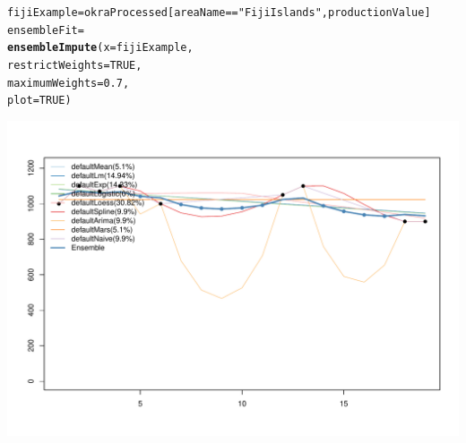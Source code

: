 \documentclass[nojss]{jss}\usepackage[]{graphicx}\usepackage[]{color}
\makeatletter
\def\maxwidth{ %
  \ifdim\Gin@nat@width>\linewidth
    \linewidth
  \else
    \Gin@nat@width
  \fi
}
\newcommand{\hlnum}[1]{\textcolor[rgb]{0.686,0.059,0.569}{#1}}%
\newcommand{\hlstr}[1]{\textcolor[rgb]{0.192,0.494,0.8}{#1}}%
\newcommand{\hlopt}[1]{\textcolor[rgb]{0,0,0}{#1}}%
\newcommand{\hlstd}[1]{\textcolor[rgb]{0.345,0.345,0.345}{#1}}%
\newcommand{\hlkwb}[1]{\textcolor[rgb]{0.69,0.353,0.396}{#1}}%
\newcommand{\hlkwc}[1]{\textcolor[rgb]{0.333,0.667,0.333}{#1}}%
\newcommand{\hlkwd}[1]{\textcolor[rgb]{0.737,0.353,0.396}{\textbf{#1}}}%
\newenvironment{kframe}{%
 \def\at@end@of@kframe{}%
 \ifinner\ifhmode%
  \def\at@end@of@kframe{\end{minipage}}%
  \begin{minipage}{\columnwidth}%
 \fi\fi%
 \def\FrameCommand##1{\hskip\@totalleftmargin \hskip-\fboxsep
 \colorbox{shadecolor}{##1}\hskip-\fboxsep
     \hskip-\linewidth \hskip-\@totalleftmargin \hskip\columnwidth}%
 \MakeFramed {\advance\hsize-\width
   \@totalleftmargin\z@ \linewidth\hsize
   \@setminipage}}%
 {\par\unskip\endMakeFramed%
 \at@end@of@kframe}
\newenvironment{knitrout}{}{} %
\makeatother
\begin{document}
\begin{knitrout}
\color{fgcolor}\begin{kframe}
\begin{alltt}
\hlstd{fijiExample} \hlkwb{=} \hlstd{okraProcessed[areaName} \hlopt{==} \hlstr{"Fiji Islands"}\hlstd{, productionValue]}
\hlstd{ensembleFit} \hlkwb{=}
    \hlkwd{ensembleImpute}\hlstd{(}\hlkwc{x} \hlstd{= fijiExample,}
                   \hlkwc{restrictWeights} \hlstd{=} \hlnum{TRUE}\hlstd{,}
                   \hlkwc{maximumWeights} \hlstd{=} \hlnum{0.7}\hlstd{,}
                   \hlkwc{plot} \hlstd{=} \hlnum{TRUE}\hlstd{)}
\end{alltt}
\end{kframe}

{\centering \includegraphics[width=\maxwidth]{figure/ensemble-imputation} 

}



\end{knitrout}
\end{document}
